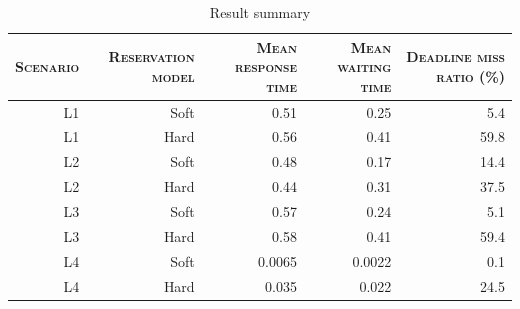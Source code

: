\documentclass[times, 10pt,twocolumn]{article}
\begin{document}
\begin{table}[t]
  \centering
  \begin{tabular}[t]{rrrrr} \hline
    \textsc{Scenario} & \textsc{Reservation model} & \textsc{Mean
      response time} & \textsc{Mean waiting time} & \textsc{Deadline
      miss ratio (\%)} \\ \hline
    L1 & Soft & 0.51   & 0.25   & 5.4  \\
    L1 & Hard & 0.56   & 0.41   & 59.8 \\
    L2 & Soft & 0.48   & 0.17   & 14.4 \\
    L2 & Hard & 0.44   & 0.31   & 37.5 \\
    L3 & Soft & 0.57   & 0.24   & 5.1  \\
    L3 & Hard & 0.58   & 0.41   & 59.4 \\
    L4 & Soft & 0.0065 & 0.0022 & 0.1  \\
    L4 & Hard & 0.035  & 0.022  & 24.5 \\ \hline    
  \end{tabular}
  \caption{Result summary}
  \label{tab:summary}
\end{table}
\end{document}
